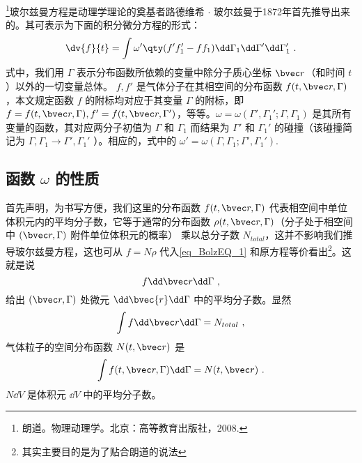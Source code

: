 

\footnote{朗道。物理动理学。北京：高等教育出版社，2008.}玻尔兹曼方程是动理学理论的奠基者路德维希 $\cdot$ 玻尔兹曼于1872年首先推导出来的。其可表示为下面的积分微分方程的形式：
\begin{equation}\label{eq_BolzEQ_1}
\dv{f}{t}=\int\omega'\qty(f'f_1'-ff_1)\dd\Gamma_1\dd\Gamma'\dd\Gamma_1'~.
\end{equation}
式中，我们用 $\Gamma$ 表示分布函数所依赖的变量中除分子质心坐标 $\bvec r$（和时间 $t$ ）以外的一切变量总体。 $f,f'$ 是气体分子在其相空间的分布函数 $f(t,\bvec r,\Gamma)$，本文规定函数 $f$ 的附标均对应于其变量 $\Gamma$ 的附标，即 $f=f(t,\bvec r,\Gamma),f'=f(t,\bvec r,\Gamma')$，等等。$\omega=\omega(\Gamma',\Gamma_1';\Gamma,\Gamma_1)$ 是其所有变量的函数，其对应两分子初值为 $\Gamma$ 和 $\Gamma_1$ 而结果为 $\Gamma'$ 和 $\Gamma_1'$ 的碰撞（该碰撞简记为 $\Gamma,\Gamma_1\rightarrow\Gamma',\Gamma_1'$ ）。相应的，式中的 $\omega'=\omega(\Gamma,\Gamma_1;\Gamma',\Gamma_1')$.

\subsection{函数 $\omega$ 的性质}
首先声明，为书写方便，我们这里的分布函数 $f(t,\bvec r,\Gamma)$ 代表相空间中单位体积元内的平均分子数，它等于通常的分布函数 $\rho(t,\bvec r,\Gamma)$（分子处于相空间中 $(\bvec r,\Gamma)$ 附件单位体积元的概率） 乘以总分子数 $N_{total}$，这并不影响我们推导玻尔兹曼方程，这也可从 $f=N\rho$ 代入\autoref{eq_BolzEQ_1} 和原方程等价看出\footnote{其实主要目的是为了贴合朗道的说法}。这就是说
\begin{equation}
f\dd \bvec r\dd\Gamma~,
\end{equation}
给出 $(\bvec r,\Gamma)$ 处微元 $\dd\bvec{r}\dd\Gamma$ 中的平均分子数。显然
\begin{equation}
\int f\dd \bvec r\dd\Gamma=N_{total}~,
\end{equation}
气体粒子的空间分布函数 $N(t,\bvec r)$ 是
\begin{equation}
\int f(t,\bvec r,\Gamma)\dd \Gamma=N(t,\bvec r)~.
\end{equation}
 $N\dd V$ 是体积元 $\dd V$ 中的平均分子数。

